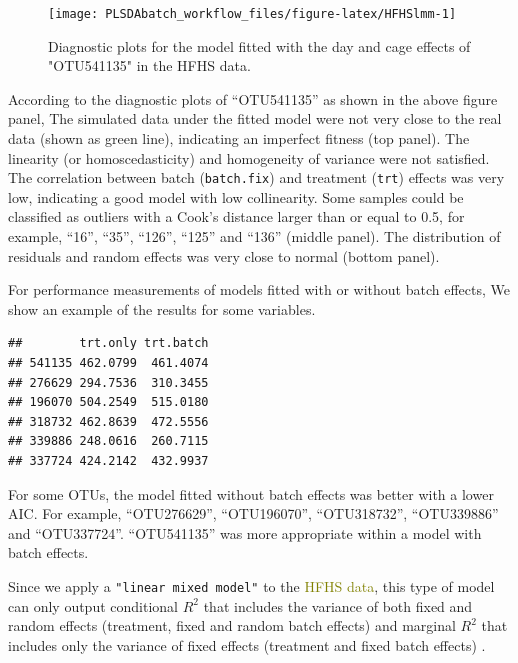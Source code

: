 \documentclass[
]{book}
\newenvironment{Shaded}{\begin{snugshade}}{\end{snugshade}}
\newcommand{\FunctionTok}[1]{\textcolor[rgb]{0.00,0.00,0.00}{#1}}
\newcommand{\NormalTok}[1]{#1}
\newcommand{\SpecialCharTok}[1]{\textcolor[rgb]{0.00,0.00,0.00}{#1}}
\begin{document}
\begin{figure}

{\centering \texttt{[image: PLSDAbatch\_workflow\_files/figure-latex/HFHSlmm-1]} 

}

\caption{Diagnostic plots for the model fitted with the day and cage effects of "OTU541135" in the HFHS data.}\label{fig:HFHSlmm}
\end{figure}

According to the diagnostic plots of ``OTU541135'' as shown in the above figure panel, The simulated data under the fitted model were not very close to the real data (shown as green line), indicating an imperfect fitness (top panel). The linearity (or homoscedasticity) and homogeneity of variance were not satisfied. The correlation between batch (\texttt{batch.fix}) and treatment (\texttt{trt}) effects was very low, indicating a good model with low collinearity. Some samples could be classified as outliers with a Cook's distance larger than or equal to 0.5, for example, ``16'', ``35'', ``126'', ``125'' and ``136'' (middle panel). The distribution of residuals and random effects was very close to normal (bottom panel).

For performance measurements of models fitted with or without batch effects, We show an example of the results for some variables.

\begin{Shaded}
\end{Shaded}

\begin{verbatim}
##        trt.only trt.batch
## 541135 462.0799  461.4074
## 276629 294.7536  310.3455
## 196070 504.2549  515.0180
## 318732 462.8639  472.5556
## 339886 248.0616  260.7115
## 337724 424.2142  432.9937
\end{verbatim}

For some OTUs, the model fitted without batch effects was better with a lower AIC. For example, ``OTU276629'', ``OTU196070'', ``OTU318732'', ``OTU339886'' and ``OTU337724''. ``OTU541135'' was more appropriate within a model with batch effects.

Since we apply a \texttt{"linear\ mixed\ model"} to the \textcolor{olive}{HFHS data}, this type of model can only output conditional \(R^2\) that includes the variance of both fixed and random effects (treatment, fixed and random batch effects) and marginal \(R^2\) that includes only the variance of fixed effects (treatment and fixed batch effects) \citep{nakagawa2013general}.
\end{document}
